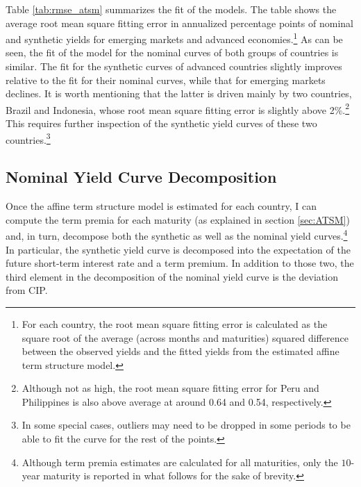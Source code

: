 {Table \ref{tab:rmse_atsm} summarizes the fit of the models. The table shows the average root mean square fitting error in annualized percentage points of nominal and synthetic yields for emerging markets and advanced economies.\footnote{For each country, the root mean square fitting error is calculated as the square root of the average (across months and maturities) squared difference between the observed yields and the fitted yields from the estimated affine term structure model.} As can be seen, the fit of the model for the nominal curves of both groups of countries is similar. The fit for the synthetic curves of advanced countries slightly improves relative to the fit for their nominal curves, while that for emerging markets declines. It is worth mentioning that the latter is driven mainly by two countries, Brazil and Indonesia, whose root mean square fitting error is slightly above 2\%.\footnote{Although not as high, the root mean square fitting error for Peru and Philippines is also above average at around 0.64 and 0.54, respectively.} This requires further inspection of the synthetic yield curves of these two countries.\footnote{In some special cases, outliers may need to be dropped in some periods to be able to fit the curve for the rest of the points.} 
	
%	


\subsection{Nominal Yield Curve Decomposition}
Once the affine term structure model is estimated for each country, I can compute the term premia for each maturity (as explained in section \ref{sec:ATSM}) and, in turn, decompose both the synthetic as well as the nominal yield curves.\footnote{Although term premia estimates are calculated for all maturities, only the $10$-year maturity is reported in what follows for the sake of brevity.} In particular, the synthetic yield curve is decomposed into the expectation of the future short-term interest rate and a term premium. In addition to those two, the third element in the decomposition of the nominal yield curve is the deviation from CIP.

}
